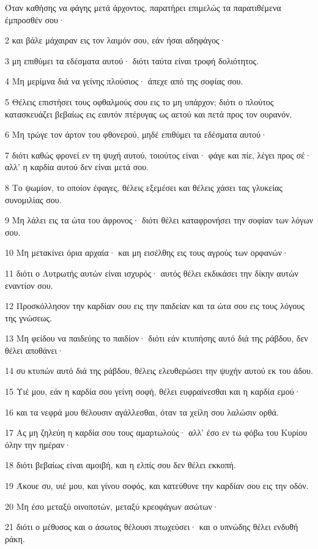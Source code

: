 \par Όταν καθήσης να φάγης μετά άρχοντος, παρατήρει επιμελώς τα παρατιθέμενα έμπροσθέν σου·
\par 2 και βάλε μάχαιραν εις τον λαιμόν σου, εάν ήσαι αδηφάγος·
\par 3 μη επιθύμει τα εδέσματα αυτού· διότι ταύτα είναι τροφή δολιότητος.
\par 4 Μη μερίμνα διά να γείνης πλούσιος· άπεχε από της σοφίας σου.
\par 5 Θέλεις επιστήσει τους οφθαλμούς σου εις το μη υπάρχον; διότι ο πλούτος κατασκευάζει βεβαίως εις εαυτόν πτέρυγας ως αετού και πετά προς τον ουρανόν.
\par 6 Μη τρώγε τον άρτον του φθονερού, μηδέ επιθύμει τα εδέσματα αυτού·
\par 7 διότι καθώς φρονεί εν τη ψυχή αυτού, τοιούτος είναι· φάγε και πίε, λέγει προς σέ· αλλ' η καρδία αυτού δεν είναι μετά σου.
\par 8 Το ψωμίον, το οποίον έφαγες, θέλεις εξεμέσει και θέλεις χάσει τας γλυκείας συνομιλίας σου.
\par 9 Μη λάλει εις τα ώτα του άφρονος· διότι θέλει καταφρονήσει την σοφίαν των λόγων σου.
\par 10 Μη μετακίνει όρια αρχαία· και μη εισέλθης εις τους αγρούς των ορφανών·
\par 11 διότι ο Λυτρωτής αυτών είναι ισχυρός· αυτός θέλει εκδικάσει την δίκην αυτών εναντίον σου.
\par 12 Προσκόλλησον την καρδίαν σου εις την παιδείαν και τα ώτα σου εις τους λόγους της γνώσεως.
\par 13 Μη φείδου να παιδεύης το παιδίον· διότι εάν κτυπήσης αυτό διά της ράβδου, δεν θέλει αποθάνει·
\par 14 συ κτυπών αυτό διά της ράβδου, θέλεις ελευθερώσει την ψυχήν αυτού εκ του άδου.
\par 15 Υιέ μου, εάν η καρδία σου γείνη σοφή, θέλει ευφραίνεσθαι και η καρδία εμού·
\par 16 και τα νεφρά μου θέλουσιν αγάλλεσθαι, όταν τα χείλη σου λαλώσιν ορθά.
\par 17 Ας μη ζηλεύη η καρδία σου τους αμαρτωλούς· αλλ' έσο εν τω φόβω του Κυρίου όλην την ημέραν·
\par 18 διότι βεβαίως είναι αμοιβή, και η ελπίς σου δεν θέλει εκκοπή.
\par 19 Άκουε συ, υιέ μου, και γίνου σοφός, και κατεύθυνε την καρδίαν σου εις την οδόν.
\par 20 Μη έσο μεταξύ οινοποτών, μεταξύ κρεοφάγων ασώτων·
\par 21 διότι ο μέθυσος και ο άσωτος θέλουσι πτωχεύσει· και ο υπνώδης θέλει ενδυθή ράκη.
